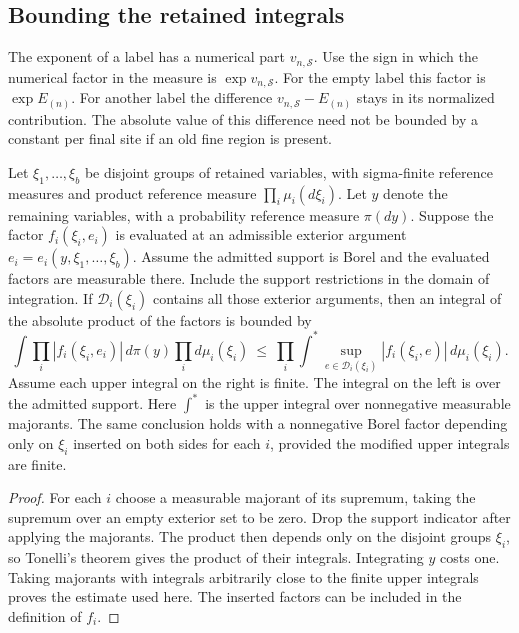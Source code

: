 \documentclass[11pt,letterpaper,reqno]{amsart}
\makeatletter
\numberwithin{equation}{section}
\theoremstyle{definition}
\newcommand{\ms@minorstart}{%
  \pushQED{\qed}\renewcommand{\qedsymbol}{$\blacksquare$}}
\newenvironment{lemma}[1][]{\ms@minorstart\ms@lemma[#1]}
  {\popQED\endms@lemma}
\theoremstyle{remark}
\makeatother
\begin{document}
\subsection{Bounding the retained integrals}
\label{rt:subsec-retained-integrals}

The exponent of a label has a numerical part \(v_{n,\mathcal S}\).
Use the sign in which the numerical factor in the measure is
\(\exp v_{n,\mathcal S}\). For the empty label this factor is
\(\exp E_{(n)}\). For another label the difference
\(v_{n,\mathcal S}-E_{(n)}\) stays in its normalized contribution.
The absolute value of this difference need not be bounded by a
constant per final site if an old fine region is present.

\begin{lemma}[Majorizing coupled integrals]\label{rt:lem-component-majorant}
Let \(\xi_1,\ldots,\xi_b\) be disjoint groups of retained
variables, with sigma-finite reference measures and product
reference measure \(\prod_i\mu_i(d\xi_i)\). Let \(y\) denote the remaining variables,
with a probability reference measure \(\pi(dy)\). Suppose the
factor \(f_i(\xi_i,e_i)\) is evaluated at an admissible exterior
argument \(e_i=e_i(y,\xi_1,\ldots,\xi_b)\). Assume the admitted
support is Borel and the evaluated factors are measurable there.
Include the support restrictions in the domain of integration.
If \(\mathcal D_i(\xi_i)\)
contains all those exterior arguments, then an integral of the
absolute product of the factors is bounded by
\begin{equation}\label{rt:eq-retained-product}
   \int \prod_i |f_i(\xi_i,e_i)|\,d\pi(y)\prod_i d\mu_i(\xi_i)
   \ \le\
   \prod_i \int^*\sup_{e\in\mathcal D_i(\xi_i)}
                         |f_i(\xi_i,e)|\,d\mu_i(\xi_i).
\end{equation}
Assume each upper integral on the right is finite. The integral
on the left is over the admitted support. Here
\(\int^*\) is the upper integral over nonnegative measurable
majorants. The same conclusion holds with a nonnegative Borel factor
depending only on \(\xi_i\) inserted on both sides for each \(i\),
provided the modified upper integrals are finite.
\end{lemma}
\begin{proof}
For each \(i\) choose a measurable majorant of its supremum, taking
the supremum over an empty exterior set to be zero. Drop the support
indicator after applying the majorants. The product then depends
only on the disjoint groups \(\xi_i\), so Tonelli's theorem gives the
product of their integrals. Integrating \(y\) costs one. Taking
majorants with integrals arbitrarily close to the finite upper
integrals proves the estimate used here. The inserted factors can
be included in the definition of \(f_i\).
\end{proof}
\end{document}
